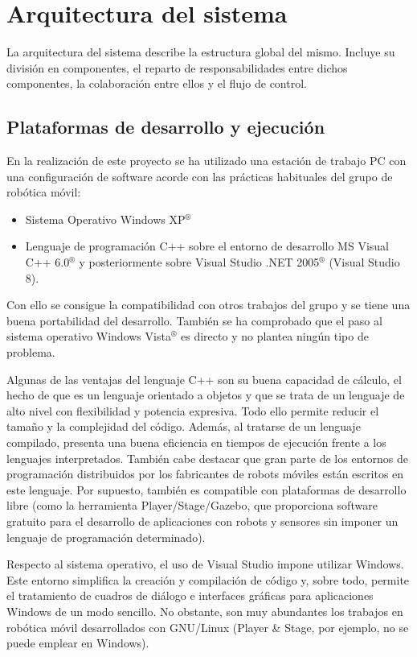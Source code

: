 
\chapter{Arquitectura del sistema}\label{ch:arquitectura}

La arquitectura del sistema describe la estructura global del mismo. Incluye su división en componentes, el reparto de responsabilidades entre dichos componentes, la colaboración entre ellos y el flujo de control.
\section{Plataformas de desarrollo y ejecución}

En la realización de este proyecto se ha utilizado una estación de trabajo PC con una configuración de software acorde con las prácticas habituales del grupo de robótica móvil:

\begin{itemize}
  \item Sistema Operativo Windows XP$^{®}$
  \item Lenguaje de programación C++ sobre el entorno de desarrollo MS Visual C++ 6.0$^{®}$ y posteriormente sobre Visual Studio .NET 2005$^{®}$ (Visual Studio 8).
\end{itemize}

Con ello se consigue la compatibilidad con otros trabajos del grupo y se tiene una buena portabilidad del desarrollo. También se ha comprobado que el paso al sistema operativo Windows Vista$^{®}$ es directo y no plantea ningún tipo de problema.

Algunas de las ventajas del lenguaje C++ son su buena capacidad de cálculo, el hecho de que es un lenguaje orientado a objetos y que se trata de un lenguaje de alto nivel con flexibilidad y potencia expresiva. Todo ello permite reducir el tamaño y la complejidad del código. Además, al tratarse de un lenguaje compilado, presenta una buena eficiencia en tiempos de ejecución frente a los lenguajes interpretados. También cabe destacar que gran parte de los entornos de programación distribuidos por los fabricantes de robots móviles están escritos en este lenguaje. Por supuesto, también es compatible con plataformas de desarrollo libre (como la herramienta Player/Stage/Gazebo, que proporciona software gratuito para el desarrollo de aplicaciones con robots y sensores sin imponer un lenguaje de programación determinado).

Respecto al sistema operativo, el uso de Visual Studio impone utilizar Windows. Este entorno simplifica la creación y compilación de código y, sobre todo, permite el tratamiento de cuadros de diálogo e interfaces gráficas para aplicaciones Windows de un modo sencillo. No obstante, son muy abundantes los trabajos en robótica móvil desarrollados con GNU/Linux (Player \& Stage, por ejemplo, no se puede emplear en Windows).

